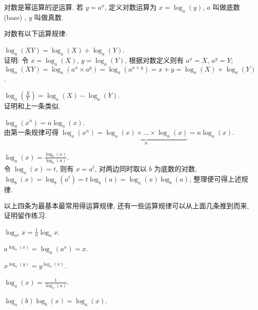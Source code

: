 \begin{tcolorbox}[size=fbox, breakable, enhanced jigsaw, title={对数 (logarithm)}]

对数是幂运算的逆运算. 若 $y=a^x$, 定义对数运算为 $x=\log_a(y)$,
$a$ 叫做底数 (base) , $y$ 叫做真数.

对数有以下运算规律:

\begin{itemize}

{\item
  $\boxed{\log_a(XY)= \log_a(X)+ \log_a(Y)}$.\\{\kaishu 证明}: 令
  $x=\log_a(X)$, $y=\log_a(Y)$, 根据对数定义则有 $a^x=X$,
  $a^y=Y$;
  $\log_a(XY)=\log_a(a^x\times a^y)=\log_a(a^{x+y})=x+y=\log_a(X)+ \log_a(Y)$.}
{\item
  $\boxed{\log_a\left(\frac{X}{Y}\right)= \log_a(X)- \log_a(Y)}$.\\
  证明和上一条类似.}
{\item
  $\boxed{\log_a(x^n)=n\log_a(x)}$.\\由第一条规律可得
  $\log_a(x^n)=\underbrace{\log_a(x)\times...\times\log_a(x)}_{n}=n\log_a(x)$.}
{\item
  $\boxed{\log_a(x)=\frac{\log_b(x)}{\log_b(a)}}$.\\令 $\log_a(x)=t$, 则有
  $x=a^t$, 对两边同时取以 $b$ 为底数的对数,
  $\log_b(x)=\log_b(a^t)=t\log_b(a)=\log_a(x)\log_b(a)$,
  整理便可得上述规律.}
\end{itemize}

以上四条为最基本最常用得运算规律,
还有一些运算规律可以从上面几条推到而来, 证明留作练习.

\begin{itemize}

{\item
  $\log_{a^n}x=\frac{1}{n}\log_{a}x$.}
{\item
  $a^{\log_a(x)}=\log_a(a^x)=x$.}
{\item
  $x^{\log_a(y)}=y^{\log_a(x)}$.}
{\item
  $\log_a(x)=\frac{1}{\log_x(a)}$.}
{\item
  $\log_a(b)\log_b(x)=\log_a(x)$.}
\end{itemize}

\end{tcolorbox}